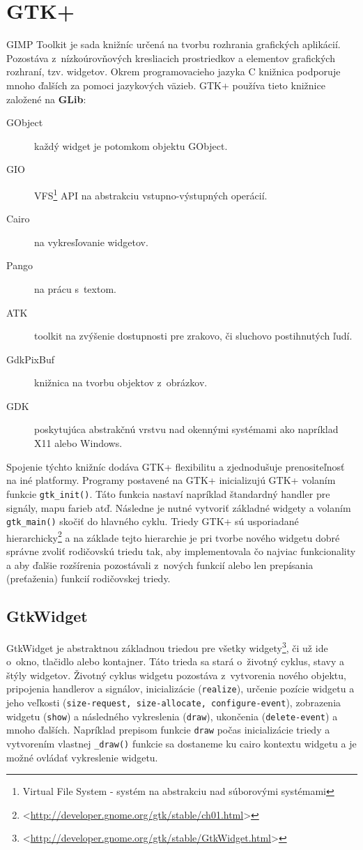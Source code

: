 \documentclass[12pt,oneside,final]{fithesis2}
\begin{document}
\section{GTK+}
GIMP Toolkit je sada knižníc určená na tvorbu rozhrania grafických aplikácií. Pozostáva z~nízkoúrovňových kresliacich prostriedkov a elementov grafických rozhraní, tzv. widgetov. Okrem programovacieho jazyka C knižnica podporuje mnoho ďalších za pomoci jazykových väzieb. GTK+ používa tieto knižnice založené na \textbf{GLib}:
\begin{description}
\item[GObject] každý widget je potomkom objektu GObject.
\item[GIO] VFS\footnote{Virtual File System - systém na abstrakciu nad súborovými systémami} API na abstrakciu vstupno-výstupných operácií.
\item[Cairo] na vykresľovanie widgetov.
\item[Pango] na prácu s~textom.
\item[ATK] toolkit na zvýšenie dostupnosti pre zrakovo, či sluchovo postihnutých ľudí.
\item[GdkPixBuf] knižnica na tvorbu objektov z~obrázkov.
\item[GDK] poskytujúca abstrakčnú vrstvu nad okennými systémami ako napríklad X11 alebo Windows.
\end{description}
Spojenie týchto knižníc dodáva GTK+ flexibilitu a zjednodušuje prenositeľnosť na iné platformy.
Programy postavené na GTK+ inicializujú GTK+ volaním funkcie \texttt{gtk\_\-init()}. Táto funkcia nastaví napríklad štandardný handler pre signály, mapu farieb atď. Následne je nutné vytvoriť základné widgety a volaním \texttt{gtk\_\-main()} skočiť do hlavného cyklu. Triedy GTK+ sú usporiadané hierarchicky\footnote{<\url{http://developer.gnome.org/gtk/stable/ch01.html}>} a na základe tejto hierarchie je pri tvorbe nového widgetu dobré správne zvoliť rodičovskú triedu tak, aby implementovala čo najviac funkcionality a aby ďalšie rozšírenia pozostávali z~nových funkcií alebo len prepísania (preťaženia) funkcií rodičovskej triedy.
\subsection{GtkWidget}
GtkWidget je abstraktnou základnou triedou pre všetky widgety\footnote{<\url{http://developer.gnome.org/gtk/stable/GtkWidget.html}>}, či už ide o~okno, tlačidlo alebo kontajner. Táto trieda sa stará o~životný cyklus, stavy a štýly widgetov. Životný cyklus widgetu pozostáva z~vytvorenia nového objektu, pripojenia handlerov a signálov, inicializácie (\texttt{realize}), určenie pozície widgetu a jeho veľkosti (\texttt{size-request, size-allocate, configure-event}), zobrazenia widgetu (\texttt{show}) a následného vykreslenia (\texttt{draw}), ukončenia (\texttt{delete-event}) a mnoho ďalších. Napríklad prepisom funkcie \texttt{draw} počas inicializácie triedy a vytvorením vlastnej \texttt{\_\-draw()} funkcie sa dostaneme ku cairo kontextu widgetu a je možné ovládať vykreslenie widgetu.
\end{document}
